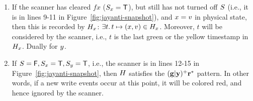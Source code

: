 \begin{enumerate}

\item\label{inv:scanner} If the scanner has cleared $\mathit{fx}$
  ($S_x = \mathsf{T}$), but still has not turned off $S$ (i.e., it is in
  lines 9-11 in Figure~\ref{fig:jayanti-snapshot}), and $x = v$ in
  physical state, then this is recorded by $H_x$:
  $\exists t\mathord{.}\, t \mapsto (x, v) \in H_x$. Moreover, $t$ will be
  considered by the scanner, i.e., $t$ is the last green or the yellow
  timestamp in $H_x$. Dually for $y$.


\item\label{inv:redzone} 
%
If $S = \mathsf{F}, S_x = \mathsf{T}, S_y = \mathsf{T}$, i.e., the scanner is in lines
12-15 in Figure~\ref{fig:jayanti-snapshot}, then $H$ satisfies the
${\mathbf{{{(g | y)^{+}}}{r^{*}}}}$ pattern. In other words, if a new write events occur at this
point, it will be colored red, and hence ignored by the scanner.

  
\end{enumerate}

